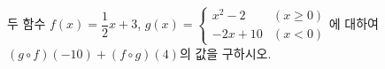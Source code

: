 \hspace*{2mm}\begin{minipage}[t]{\dimexpr\linewidth-2mm\relax}\vspace{0pt}
두 함수 $f(x)=\dfrac{1}{2}x+3$, $g(x)=\begin{cases} x^2-2 & (x\ge 0) \\ -2x+10 & (x<0) \end{cases}$에 대하여 $(g\circ f)(-10)+(f\circ g)(4)$의 값을 구하시오.\end{minipage}
